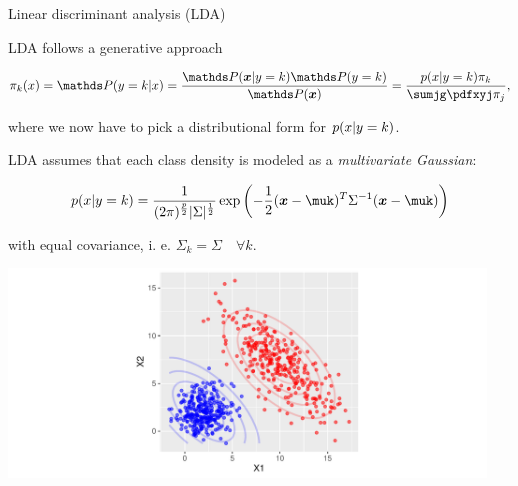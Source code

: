 \documentclass[11pt,compress,t,notes=noshow, xcolor=table]{beamer}
\newenvironment{knitrout}{}{} %
\begin{document}
\begin{vbframe}{Linear discriminant analysis (LDA)}


LDA follows a generative approach

$$\pikx = \postk = \frac{\P(\xv | y = k) \P(y = k)}{\P(\xv)} = \frac{\pdfxyk \pik}{\sumjg \pdfxyj \pi_j},$$
  
where we now have to pick a distributional form for $p(x | y=k)$.

\framebreak

LDA assumes that each class density is modeled as a \emph{multivariate Gaussian}:

$$
\pdfxyk = \frac{1}{(2\pi)^{\frac{p}{2}}|\Sigma|^{\frac{1}{2}}} \exp\left(-\frac{1}{2}(\xv - \muk)^T \Sigma^{-1} (\xv - \muk)\right)
$$

with equal covariance, i. e. $\Sigma_k = \Sigma \quad \forall k$. \\


\begin{knitrout}\scriptsize
{}\color{fgcolor}

{\centering \includegraphics[width=0.95\textwidth]{figure/reg_class_dis_1} 

}




\end{knitrout}
\end{vbframe}
\end{document}
